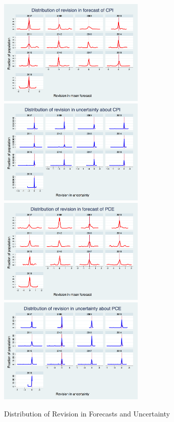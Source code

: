 \documentclass[]{article}
\begin{document}
\begin{figure}[ht]
	\centering
	\includegraphics[width=7cm]{figures/PRCCPIMean01_rv_true_hist.png} 
	\includegraphics[width=7cm]{figures/PRCCPIVar01_rv_true_hist.png}  \\
	\smallskip
	\includegraphics[width=7cm]{figures/PRCPCEMean01_rv_true_hist.png} 
	\includegraphics[width=7cm]{figures/PRCPCEVar01_rv_true_hist.png}  \\
	\caption{Distribution of Revision in Forecasts and Uncertainty}
	\label{RevisionHist}
\end{figure}
\end{document}
